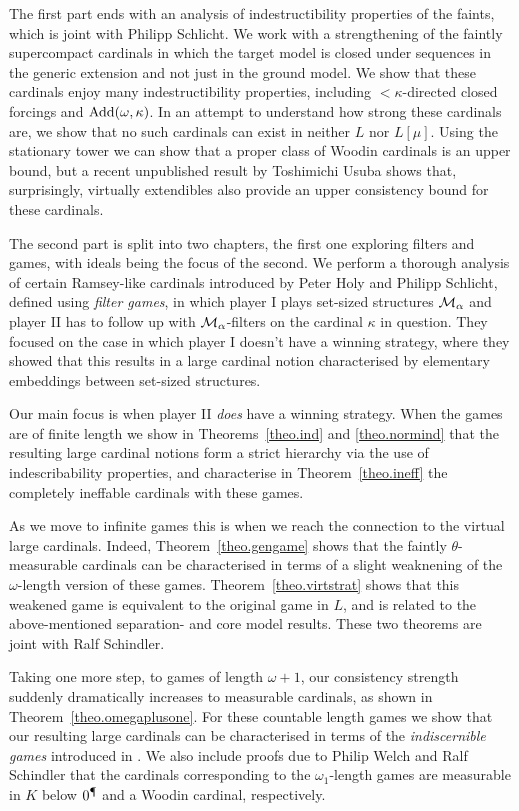 \documentclass[../main]{subfiles}
\begin{document}
\begin{onehalfspacing}
\quad The first part ends with an analysis of indestructibility properties of the faints, which is joint with Philipp Schlicht. We work with a strengthening of the faintly supercompact cardinals in which the target model is closed under sequences in the generic extension and not just in the ground model. We show that these cardinals enjoy many indestructibility properties, including ${<}\kappa$-directed closed forcings and $\operatorname{Add}(\omega,\kappa)$. In an attempt to understand how strong these cardinals are, we show that no such cardinals can exist in neither $L$ nor $L[\mu]$. Using the stationary tower we can show that a proper class of Woodin cardinals is an upper bound, but a recent unpublished result by Toshimichi Usuba shows that, surprisingly, virtually extendibles also provide an upper consistency bound for these cardinals.

\quad The second part is split into two chapters, the first one exploring filters and games, with ideals being the focus of the second. We perform a thorough analysis of certain Ramsey-like cardinals introduced by Peter Holy and Philipp Schlicht, defined using \textit{filter games}, in which player I plays set-sized structures $\operatorname{\mathcal M}_\alpha$ and player II has to follow up with $\operatorname{\mathcal M}_\alpha$-filters on the cardinal $\kappa$ in question. They focused on the case in which player I doesn't have a winning strategy, where they showed that this results in a large cardinal notion characterised by elementary embeddings between set-sized structures. 

\quad Our main focus is when player II \textit{does} have a winning strategy. When the games are of finite length we show in Theorems~\ref{theo.ind} and \ref{theo.normind} that the resulting large cardinal notions form a strict hierarchy via the use of indescribability properties, and characterise in Theorem~\ref{theo.ineff} the completely ineffable cardinals with these games.

\quad As we move to infinite games this is when we reach the connection to the virtual large cardinals. Indeed, Theorem~\ref{theo.gengame} shows that the faintly $\theta$-measurable cardinals can be characterised in terms of a slight weaknening of the $\omega$-length version of these games. Theorem~\ref{theo.virtstrat} shows that this weakened game is equivalent to the original game in $L$, and is related to the above-mentioned separation- and core model results. These two theorems are joint with Ralf Schindler. 

\quad Taking one more step, to games of length $\omega+1$, our consistency strength suddenly dramatically increases to measurable cardinals, as shown in Theorem~\ref{theo.omegaplusone}. For these countable length games we show that our resulting large cardinals can be characterised in terms of the \textit{indiscernible games} introduced in \cite{SharpeWelch}. We also include proofs due to Philip Welch and Ralf Schindler that the cardinals corresponding to the $\omega_1$-length games are measurable in $K$ below $0^\mathparagraph$ and a Woodin cardinal, respectively.


\end{onehalfspacing}
\end{document}
